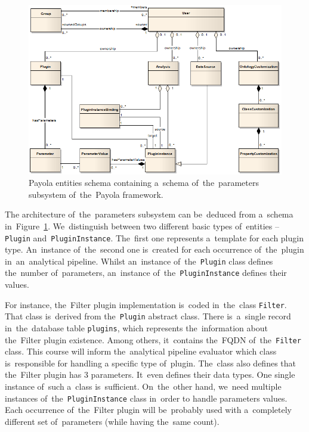 \begin{figure}
	\centering
	\includegraphics[width=140mm]{img/params-schema.png}
	\caption{Payola entities schema containing a~schema of~the~parameters 
	subsystem of~the~Payola framework.~\cite{payola:dg}}
	\label{fig:params-schema}
\end{figure}

The architecture of~the~parameters subsystem can be~deduced
from a~schema in~Figure~\ref{fig:params-schema}. We~distinguish between two 
different basic types of~entities -- \texttt{Plugin} and~\texttt{PluginInstance}. The~first 
one represents a~template for each plugin type. An~instance of~the~second one is~created for
each occurrence of~the~plugin in~an~analytical pipeline. Whilst an~instance of~the~\texttt{Plugin}
class defines the~number of~parameters, an~instance of~the~\texttt{PluginInstance} 
defines their values.

For instance, the~Filter plugin implementation is~coded in~the~class \texttt{Filter}.
That class is~derived from the~\texttt{Plugin} abstract class. There is~a~single record in~the~database table
\texttt{plugins}, which represents the~information about the~Filter plugin existence.
Among others, it~contains the~FQDN of~the~\texttt{Filter} class. This course will inform the~analytical
pipeline evaluator which class is~responsible for handling
a specific type of~plugin. The~class also defines that the~Filter plugin has 3 parameters. It~even 
defines their data types. One single instance of~such a~class is~sufficient. On~the~other hand, we~need
multiple instances of~the~\texttt{PluginInstance} class in~order to
handle parameters values. Each occurrence of~the~Filter plugin will be~probably 
used with a~completely different set of~parameters (while having the~same count).

